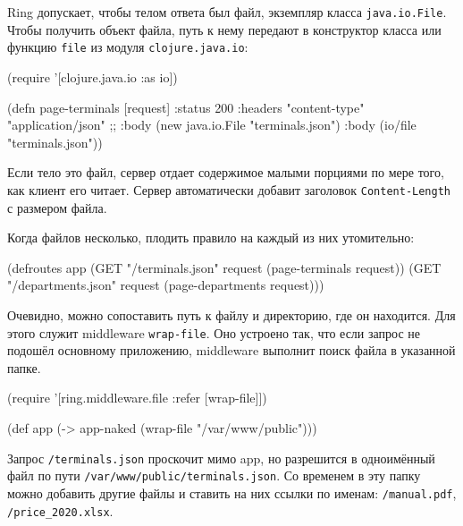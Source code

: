 
Ring допускает, чтобы телом ответа был файл, экземпляр класса
\verb|java.io.File|. Чтобы получить объект файла, путь к нему передают в
конструктор класса или функцию \verb|file| из модуля \verb|clojure.java.io|:

\begin{english}
  \begin{clojure}
(require '[clojure.java.io :as io])

(defn page-terminals [request]
  {:status 200
   :headers {"content-type" "application/json"}
   ;; :body (new java.io.File "terminals.json")
   :body (io/file "terminals.json")})
  \end{clojure}
\end{english}


Если тело это файл, сервер отдает содержимое малыми порциями по мере того, как
клиент его читает. Сервер автоматически добавит заголовок
\verb|Content-Length| с размером файла.

Когда файлов несколько, плодить правило на каждый из них утомительно:

\begin{english}
  \begin{clojure}
(defroutes app
  (GET "/terminals.json"   request (page-terminals request))
  (GET "/departments.json" request (page-departments request)))
  \end{clojure}
\end{english}


Очевидно, можно сопоставить путь к файлу и директорию, где он находится. Для
этого служит middleware \verb|wrap-file|. Оно устроено так, что если запрос не
подошёл основному приложению, middleware выполнит поиск файла в указанной папке.

\begin{english}
  \begin{clojure}
(require '[ring.middleware.file :refer [wrap-file]])

(def app (-> app-naked
             (wrap-file "/var/www/public")))
  \end{clojure}
\end{english}

Запрос \verb|/terminals.json| проскочит мимо app, но разрешится в
одноимённый файл по пути \verb|/var/www/public/terminals.json|. Со
временем в эту папку можно добавить другие файлы и ставить на них ссылки по
именам: \verb|/manual.pdf|, \verb|/price_2020.xlsx|.

